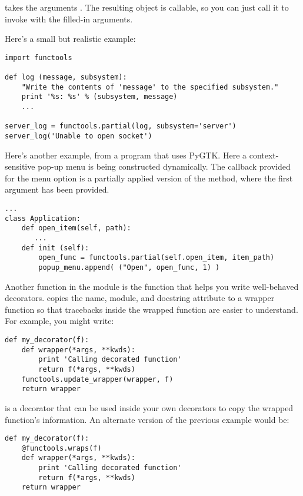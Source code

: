\documentclass{howto}
\begin{document}
 takes the arguments
.  The resulting
object is callable, so you can just call it to invoke 
with the filled-in arguments.

Here's a small but realistic example:

\begin{verbatim}
import functools

def log (message, subsystem):
    "Write the contents of 'message' to the specified subsystem."
    print '%s: %s' % (subsystem, message)
    ...

server_log = functools.partial(log, subsystem='server')
server_log('Unable to open socket')
\end{verbatim}

Here's another example, from a program that uses PyGTK.  Here a
context-sensitive pop-up menu is being constructed dynamically.  The
callback provided for the menu option is a partially applied version
of the  method, where the first argument has been
provided.

\begin{verbatim}
...
class Application:
    def open_item(self, path):
       ...
    def init (self):
        open_func = functools.partial(self.open_item, item_path)
        popup_menu.append( ("Open", open_func, 1) )
\end{verbatim}


Another function in the  module is the
 function that
helps you write well-behaved decorators.  
copies the name, module, and docstring attribute to a wrapper function
so that tracebacks inside the wrapped function are easier to
understand.  For example, you might write:

\begin{verbatim}
def my_decorator(f):
    def wrapper(*args, **kwds):
        print 'Calling decorated function'
        return f(*args, **kwds)
    functools.update_wrapper(wrapper, f)
    return wrapper
\end{verbatim}

 is a decorator that can be used inside your own
decorators to copy the wrapped function's information.  An alternate 
version of the previous example would be:

\begin{verbatim}
def my_decorator(f):
    @functools.wraps(f)
    def wrapper(*args, **kwds):
        print 'Calling decorated function'
        return f(*args, **kwds)
    return wrapper
\end{verbatim}
\end{document}
